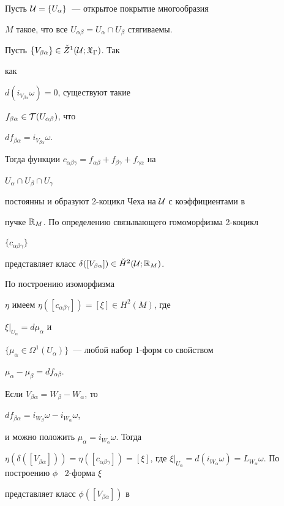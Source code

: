 \begin{pf}


Пусть ${\cal U} = \{U_\alpha\}$~--- открытое покрытие многообразия


$M$ такое, что все $U_{\alpha\beta}=U_\alpha \cap U_\beta$ стягиваемы.


Пусть $\{V_{\beta\alpha}\} \in \check Z^1({\cal U};{\frak X}_\Gamma)$. Так


как


$d(i_{V_{\beta\alpha}} \omega) =0$, существуют такие


$f_{\beta\alpha} \in {\cal T}(U_{\alpha\beta})$, что


$d f_{\beta\alpha} = i_{V_{\beta\alpha}} \omega$.


Тогда функции $c_{\alpha\beta\gamma} = f_{\alpha\beta} +


f_{\beta\gamma} + f_{\gamma\alpha}$ на


$U_\alpha \cap U_\beta \cap U_\gamma$


постоянны и образуют 2-коцикл Чеха на ${\cal U}$ с коэффициентами в


пучке ${\Bbb R}_M$. По определению связывающего гомоморфизма 2-коцикл


$\{ c_{\alpha\beta\gamma}\}$


представляет класс $\delta([V_{\beta\alpha}]) \in


\check H^2(\cU; \R_M)$.





По построению изоморфизма


$\eta$ имеем $\eta([c_{\alpha\beta\gamma}])= [\xi] \in H^2(M)$, где


$\xi|_{U_\alpha} = d\mu_\alpha$ и


$\{\mu_\alpha \in \Omega^1(U_\alpha)\}$~--- любой набор 1-форм со свойством


$\mu_\alpha - \mu_\beta = df_{\alpha\beta}$.


Если $V_{\beta\alpha} = W_\beta - W_\alpha$, то


$df_{\beta\alpha} = i_{W_\beta}\omega - i_{W_\alpha}\omega$,


и можно положить $\mu_\alpha = i_{W_\alpha}\omega$. Тогда


$\eta(\delta([V_{\beta\alpha}])) = \eta([c_{\alpha\beta\gamma}])


= [\xi]$, где $\xi|_{U_\alpha} = d(i_{W_\alpha}\omega) =


L_{W_\alpha}\omega$. По построению $\phi$ \ 2-форма $\xi$


представляет класс $\phi([V_{\beta\alpha}])$ в



\end{pf}
